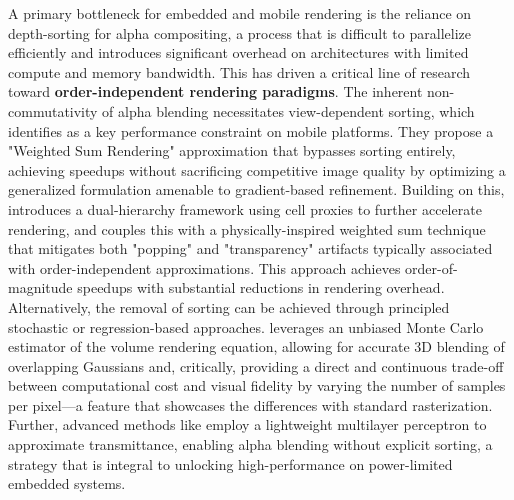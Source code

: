 \documentclass[11pt,a4paper]{article}
\begin{document}
A primary bottleneck for embedded and mobile rendering is the reliance on depth-sorting for alpha compositing, a process that is difficult to parallelize efficiently and introduces significant overhead on architectures with limited compute and memory bandwidth. This has driven a critical line of research toward \textbf{order-independent rendering paradigms}. The inherent non-commutativity of alpha blending necessitates view-dependent sorting, which \cite{arxiv:2410.18931v2} identifies as a key performance constraint on mobile platforms. They propose a "Weighted Sum Rendering" approximation that bypasses sorting entirely, achieving speedups without sacrificing competitive image quality by optimizing a generalized formulation amenable to gradient-based refinement. Building on this, \cite{arxiv:2508.03180v2} introduces a dual-hierarchy framework using cell proxies to further accelerate rendering, and couples this with a physically-inspired weighted sum technique that mitigates both "popping" and "transparency" artifacts typically associated with order-independent approximations. This approach achieves order-of-magnitude speedups with substantial reductions in rendering overhead. Alternatively, the removal of sorting can be achieved through principled stochastic or regression-based approaches. \cite{arxiv:2503.24366v1} leverages an unbiased Monte Carlo estimator of the volume rendering equation, allowing for accurate 3D blending of overlapping Gaussians and, critically, providing a direct and continuous trade-off between computational cost and visual fidelity by varying the number of samples per pixel---a feature that showcases the differences with standard rasterization. Further, advanced methods like \cite{arxiv:2506.07069v2} employ a lightweight multilayer perceptron to approximate transmittance, enabling alpha blending without explicit sorting, a strategy that is integral to unlocking high-performance on power-limited embedded systems.
\end{document}

